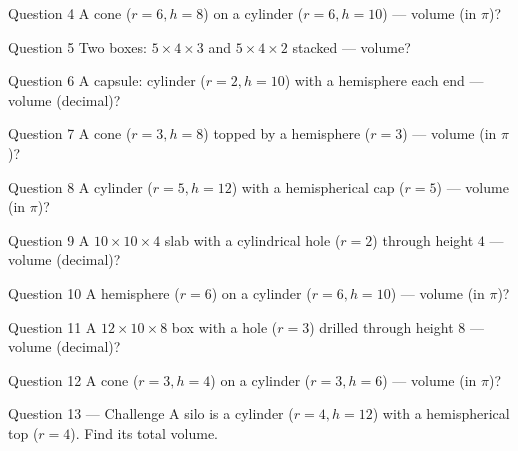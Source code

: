 \documentclass[11pt]{article}
\begin{document}
\begin{qbox}{Question 4}
A cone ($r=6,h=8$) on a cylinder ($r=6,h=10$) — volume (in $\pi$)?\workspace{2.4cm}
\end{qbox}

\begin{qbox}{Question 5}
Two boxes: $5\times4\times3$ and $5\times4\times2$ stacked — volume?\workspace{2.4cm}
\end{qbox}

\begin{qbox}{Question 6}
A capsule: cylinder ($r=2,h=10$) with a hemisphere each end — volume (decimal)?\workspace{2.4cm}
\end{qbox}

\begin{qbox}{Question 7}
A cone ($r=3,h=8$) topped by a hemisphere ($r=3$) — volume (in $\pi$)?\workspace{2.4cm}
\end{qbox}

\begin{qbox}{Question 8}
A cylinder ($r=5,h=12$) with a hemispherical cap ($r=5$) — volume (in $\pi$)?\workspace{2.4cm}
\end{qbox}

\begin{qbox}{Question 9}
A $10\times10\times4$ slab with a cylindrical hole ($r=2$) through height $4$ — volume (decimal)?\workspace{2.4cm}
\end{qbox}

\begin{qbox}{Question 10}
A hemisphere ($r=6$) on a cylinder ($r=6,h=10$) — volume (in $\pi$)?\workspace{2.4cm}
\end{qbox}

\begin{qbox}{Question 11}
A $12\times10\times8$ box with a hole ($r=3$) drilled through height $8$ — volume (decimal)?\workspace{2.4cm}
\end{qbox}

\begin{qbox}{Question 12}
A cone ($r=3,h=4$) on a cylinder ($r=3,h=6$) — volume (in $\pi$)?\workspace{2.4cm}
\end{qbox}

\begin{qbox}{Question 13 --- Challenge}
A silo is a cylinder ($r=4,h=12$) with a hemispherical top ($r=4$). Find its total volume.\workspace{3.4cm}
\end{qbox}

\clearpage
{}
\end{document}
